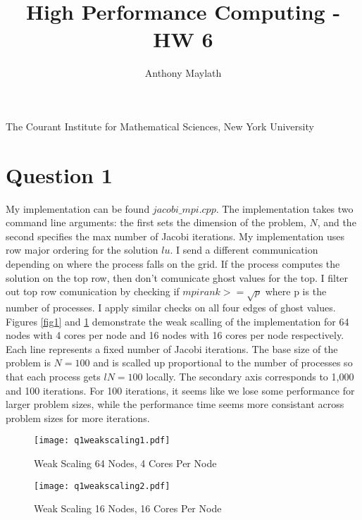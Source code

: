 \documentclass[10pt]{article}
\title{High Performance Computing - HW 6}
\author{Anthony Maylath}
\begin{document}
\maketitle

\begin{center}

The Courant Institute for Mathematical Sciences, New York University \\ 

\end{center}

\setcounter{MaxMatrixCols}{13}

\section{Question 1}

My implementation can be found $jacobi\_mpi.cpp$. The implementation takes two command line arguments: the first sets the dimension of the problem, $N$, and the second specifies the max number of Jacobi iterations. My implementation uses row major ordering for the solution $lu$. I send a different communication depending on where the process falls on the grid. If the process computes the solution on the top row, then don't comunicate ghost values for the top. I filter out top row comunication by checking if $mpirank >= \sqrt{p}$ where p is the number of processes. I apply similar checks on all four edges of ghost values.\\

Figures \ref{fig1} and \ref{fig2} demonstrate the weak scalling of the implementation for 64 nodes with 4 cores per node and 16 nodes with 16 cores per node respectively. Each line represents a fixed number of Jacobi iterations. The base size of the problem is $N=100$ and is scalled up proportional to the number of processes so that each process gets $lN = 100$ locally. The secondary axis corresponds to 1,000 and 100 iterations. For 100 iterations, it seems like we lose some performance for larger problem sizes, while the performance time seems more consistant across problem sizes for more iterations. 

\lipsum

\begin{figure}[!h]
    \centering
    \begin{minipage}{0.45\textwidth}
        \centering
        \texttt{[image: q1weakscaling1.pdf]} %
        \caption{Weak Scaling 64 Nodes, 4 Cores Per Node}
        \label{fig1}
    \end{minipage}\hfill
         \begin{minipage}{0.45\textwidth}
        \centering
        \texttt{[image: q1weakscaling2.pdf]} %
        \caption{Weak Scaling 16 Nodes, 16 Cores Per Node}
        \label{fig2}
    \end{minipage}
\end{figure}
\end{document}
